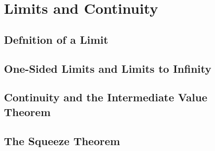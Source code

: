 \chapter{Limits and Continuity}

\section{Defnition of a Limit}

\section{One-Sided Limits and Limits to Infinity}

\section{Continuity and the Intermediate Value Theorem}

\section{The Squeeze Theorem}